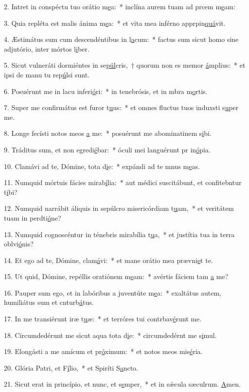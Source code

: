 2. Intret in conspéctu tuo orátio m\uline{e}a:~* inclína aurem tuam ad prcem m\uline{e}am:\par 
3. Quia repléta est malis ánima m\uline{e}a:~* et vita mea inférno apprpin\uline{quá}vit.\par 
4. Æstimátus sum cum descendéntibus in l\uline{a}cum:~* factus sum sicut homo sine adjutório, inter mórtos l\uline{i}ber.\par 
5. Sicut vulneráti dormiéntes in se\uline{púl}cris,~† quorum non es memor \uline{á}mplius:~* et ipsi de manu tu rep\uline{ú}lsi sunt.\par 
6. Posuérunt me in lacu inferi\uline{ó}ri:~* in tenebrósis, et in mbra m\uline{o}rtis.\par 
7. Super me confirmátus est furor t\uline{u}us:~* et omnes fluctus tuos induxsti s\uline{u}per me.\par 
8. Longe fecísti notos meos \uline{a} me:~* posuérunt me abominatinem s\uline{i}bi.\par 
9. Tráditus sum, et non egredi\uline{é}bar:~* óculi mei languérunt pr in\uline{ó}pia.\par 
10. Clamávi ad te, Dómine, tota d\uline{i}e:~* expándi ad te mnus m\uline{e}as.\par 
11. Numquid mórtuis fácies mirab\uline{í}lia:~* aut médici suscitábunt, et confitebntur t\uline{i}bi?\par 
12. Numquid narrábit áliquis in sepúlcro misericórdiam t\uline{u}am,~* et veritátem tuam in perdti\uline{ó}ne?\par 
13. Numquid cognoscéntur in ténebris mirabília t\uline{u}a,~* et justítia tua in terra oblvi\uline{ó}nis?\par 
14. Et ego ad te, Dómine, clam\uline{á}vi:~* et mane orátio mea prævni\uline{e}t te.\par 
15. Ut quid, Dómine, repéllis oratiónem m\uline{e}am:~* avértis fáciem tam \uline{a} me?\par 
16. Pauper sum ego, et in labóribus a juventúte m\uline{e}a:~* exaltátus autem, humiliátus sum et cnturb\uline{á}tus.\par 
17. In me transiérunt iræ t\uline{u}æ:~* et terróres tui contrbav\uline{é}runt me.\par 
18. Circumdedérunt me sicut aqua tota d\uline{i}e:~* circumdedérnt me s\uline{i}mul.\par 
19. Elongásti a me amícum et pr\uline{ó}ximum:~* et notos meos  mis\uline{é}ria.\par 
20. Glória Patri, et F\uline{í}lio,~* et Spiríti S\uline{a}ncto.\par 
21. Sicut erat in princípio, et nunc, et s\uline{e}mper,~* et in sǽcula sæculrum. \uline{A}men.\par 
